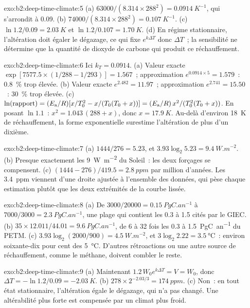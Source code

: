 \begin{solution}{exo:b2:deep-time-climate:5}
(a) $63000/(8.314\times288^2) = \qty{0.0914}{K^{-1}}$, qui s'arrondit à 0.09. (b) $74000/(8.314
\times288^2) = \qty{0.107}{K^{-1}}$. (c) $\ln1.2/0.09 = \qty{2.03}{K}$ et $\ln 1.2/0.107 =
\qty{1.70}{K}$. (d) En régime stationnaire, l'altération doit égaler le dégazage, ce qui fixe $e^{k
\Delta T}$ donc $\Delta T$~; la sensibilité ne détermine que la quantité de dioxyde de carbone qui produit ce
réchauffement.
\end{solution}

\begin{solution}{exo:b2:deep-time-climate:6}
Ici $k_T = 0.0914$. (a) Valeur exacte $\exp[7577.5\times(1/288 - 1/293)] = 1.567$~; approximation
$e^{0.0914\times5} = 1.579$~: \qty{0.8}{\percent} trop élevée. (b) Valeur exacte $e^{2.482} = 11.97$~;
approximation $e^{2.741} = 15.50$~: \qty{30}{\percent} trop élevée. (c) $\ln(\text{rapport}) = (E_{\text
a}/R)[x/T_0^2 - x/(T_0(T_0 + x))] = (E_{\text a}/R)\,x^2/(T_0^2(T_0 + x))$. En posant $\ln1.1$~:
$x^2 = 1.043\,(288 + x)$, donc $x = \qty{17.9}{K}$. Au-delà d'environ \qty{18}{K} de réchauffement, la forme
exponentielle surestime l'altération de plus d'un dixième.
\end{solution}

\begin{solution}{exo:b2:deep-time-climate:7}
(a) $1444/276 = 5.23$, et $3.93\log_2 5.23 = \qty{9.4}{W.m^{-2}}$. (b) Presque exactement les
\qty{9}{W.m^{-2}} du Soleil~: les deux forçages se compensent. (c) $(1444 - 276)/419.5 =
\qty{2.8}{ppm}$ par million d'années. Les \qty{3.4}{ppm} viennent d'une droite ajustée à l'ensemble des
données, qui pèse chaque estimation plutôt que les deux extrémités de la courbe lissée.
\end{solution}

\begin{solution}{exo:b2:deep-time-climate:8}
(a) De $3000/20000 = \qty{0.15}{PgC.an^{-1}}$ à $7000/3000 = \qty{2.3}{PgC.an^{-1}}$, une plage
qui contient les 0.3 à 1.5 cités par le GIEC. (b) $35\times12.011/44.01 = \qty{9.6}{PgC.an^{-1}}$, de 6 à
32 fois les 0.3 à \qty{1.5}{PgC.an^{-1}} du PETM. (c) $3.93\log_2(2000/900) = \qty{4.5}{W.m^{-2}}$,
et $3\log_2 2.22 = \qty{3.5}{\celsius}$~: environ soixante-dix pour cent des \qty{5}{\celsius}. D'autres
rétroactions ou une autre source de réchauffement, comme le méthane, doivent combler le reste.
\end{solution}

\begin{solution}{exo:b2:deep-time-climate:9}
(a) Maintenant $1.2\,W_0e^{k\Delta T} = V = W_0$, donc $\Delta T = -\ln 1.2/0.09 = \qty{-2.03}{K}$.
(b) $278\times2^{-2.03/3} = \qty{174}{ppm}$. (c) Non~: en tout état stationnaire, l'altération égale le
dégazage, qui n'a pas changé. Une altérabilité plus forte est compensée par un climat plus froid.
\end{solution}

